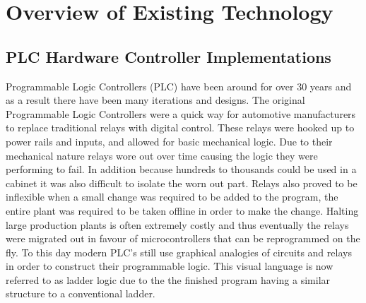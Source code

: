 
\chapter{Overview of Existing Technology}
\section{PLC Hardware Controller Implementations}
Programmable Logic Controllers (PLC) have been around for over 30 years and as a result there have been many iterations and designs. The original Programmable Logic Controllers were a quick way for automotive manufacturers to replace traditional relays with digital control. These relays were hooked up to power rails and inputs, and allowed for basic mechanical logic. Due to their mechanical nature relays wore out over time causing the logic they were performing to fail. In addition because hundreds to thousands could be used in a cabinet it was also difficult to isolate the worn out part. Relays also proved to be inflexible when a small change was required to be added to the program, the entire plant was required to be taken offline in order to make the change. Halting large production plants is often extremely costly and thus eventually the relays were migrated out in favour of microcontrollers that can be reprogrammed on the fly. To this day modern PLC's still use graphical analogies of circuits and relays in order to construct their programmable logic. This visual language is now referred to as ladder logic due to the the finished program having a similar structure to a conventional ladder. 

